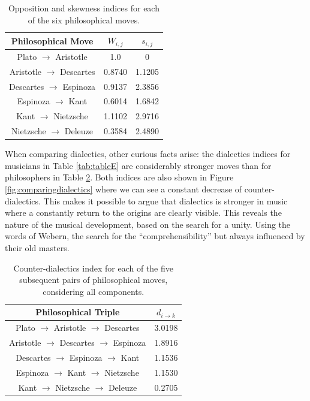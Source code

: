 \documentclass[
 aip,
 jmp,
 amsmath,amssymb,
 reprint,
]{revtex4-1}
\begin{document}
\begin{table}%
\caption{\label{tab:tablephiOI}Opposition and skewness indices for each
of the six philosophical moves.}

\begin{tabular}{|c||c|c|}
\hline
Philosophical Move & $W_{i,j}$ & $s_{i,j}$ \\
\hline \hline
Plato $\rightarrow$ Aristotle     & 1.0    & 0 \\
Aristotle $\rightarrow$ Descartes & 0.8740 & 1.1205 \\
Descartes $\rightarrow$ Espinoza  & 0.9137 & 2.3856 \\
Espinoza $\rightarrow$ Kant       & 0.6014 & 1.6842 \\
Kant $\rightarrow$ Nietzsche      & 1.1102 & 2.9716 \\
Nietzsche $\rightarrow$ Deleuze   & 0.3584 & 2.4890 \\
\hline
\end{tabular}
\end{table}

When comparing dialectics, other curious facts arise: the dialectics
indices for musicians in Table \ref{tab:tableE} are considerably stronger moves than for
philosophers in Table \ref{tab:tablephiE}. Both indices are also shown in Figure
\ref{fig:comparingdialectics} where we can see a constant decrease
of counter-dialectics. This makes it possible to argue
that dialectics is stronger in music where a
constantly return to the origins are clearly visible. This reveals the nature of the
musical development, based on the search for a unity. Using the words
of Webern, the search for the ``comprehensibility'' but always
influenced by their old masters.

\begin{table}%
\caption{\label{tab:tablephiE} Counter-dialectics index for each
of the five subsequent pairs of philosophical moves, considering all components.}

\begin{tabular}{|c||c|}
\hline
Philosophical Triple & $d_{i \rightarrow k}$ \\
\hline \hline
Plato $\rightarrow$ Aristotle $\rightarrow$ Descartes    & 3.0198 \\
Aristotle $\rightarrow$ Descartes $\rightarrow$ Espinoza & 1.8916 \\
Descartes $\rightarrow$ Espinoza $\rightarrow$ Kant      & 1.1536 \\
Espinoza $\rightarrow$ Kant $\rightarrow$ Nietzsche      & 1.1530 \\
Kant $\rightarrow$ Nietzsche $\rightarrow$ Deleuze       & 0.2705 \\
\hline
\end{tabular}
\end{table}
\end{document}
